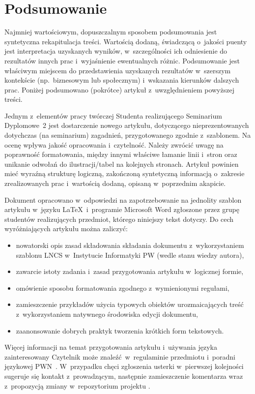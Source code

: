 \section{Podsumowanie}
\label{sec:summary}

Najmniej wartościowym, dopuszczalnym sposobem podsumowania jest syntetyczna rekapitulacja treści. Wartością dodaną, świadczącą o~jakości puenty jest interpretacja uzyskanych wyników, w~szczególności ich odniesienie do rezultatów innych prac i~wyjaśnienie ewentualnych różnic. Podsumowanie jest właściwym miejscem do przedstawienia uzyskanych rezultatów w~szerszym kontekście (np.~biznesowym lub społecznym) i~wskazania kierunków dalszych prac. Poniżej podsumowano (pokrótce) artykuł z~uwzględnieniem powyższej treści.

Jednym z~elementów pracy twórczej Studenta realizującego Seminarium Dyplomowe~2 jest dostarczenie nowego artykułu, dotyczącego nieprezentowanych dotychczas (na seminarium) zagadnień, przygotowanego zgodnie z~szablonem. Na ocenę wpływa jakość opracowania i~czytelność. Należy zwrócić uwagę na poprawność formatowania, między innymi właściwe łamanie linii i~stron oraz unikanie odwołań do ilustracji/tabel na kolejnych stronach. Artykuł powinien mieć wyraźną strukturę logiczną, zakończoną syntetyczną informacją o~zakresie zrealizowanych prac i~wartością dodaną, opisaną w~poprzednim akapicie.

Dokument opracowano w~odpowiedzi na zapotrzebowanie na jednolity szablon artykułu w~języku \LaTeX~i~programie Microsoft Word zgłoszone przez grupę studentów realizujących przedmiot, którego niniejszy tekst dotyczy. Do cech wyróżniających artykułu można zaliczyć:

\begin{itemize}
	\item nowatorski opis zasad składowania składania dokumentu z~wykorzystaniem szablonu LNCS w~Instytucie Informatyki PW (wedle stanu wiedzy autora),
	\item zawarcie istoty zadania i~zasad przygotowania artykułu w~logicznej formie,
	\item omówienie sposobu formatowania zgodnego z~wymienionymi regułami,
	\item zamieszczenie przykładów użycia typowych obiektów urozmaicających treść z~wykorzystaniem natywnego środowiska edycji dokumentu,
	\item zaanonsowanie dobrych praktyk tworzenia krótkich form tekstowych.
\end{itemize}

Więcej informacji na temat przygotowania artykułu i~używania języka zainteresowany Czytelnik może znaleźć w~regulaminie przedmiotu i~poradni językowej PWN~\cite{ref:pwn}. W~przypadku chęci zgłoszenia usterki w~pierwszej kolejności sugeruje się kontakt z~prowadzącym, następnie zamieszczenie komentarza wraz z~propozycją zmiany w~repozytorium projektu \cite{ref:github}.
